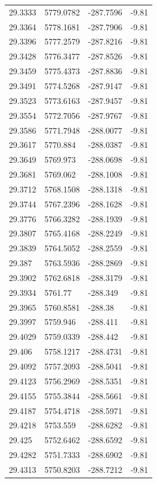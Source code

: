 \begin{table}[H]
\begin{tabular}{llll}
29.3333 & 5779.0782 & -287.7596 & -9.81 \\
29.3364 & 5778.1681 & -287.7906 & -9.81 \\
29.3396 & 5777.2579 & -287.8216 & -9.81 \\
29.3428 & 5776.3477 & -287.8526 & -9.81 \\
29.3459 & 5775.4373 & -287.8836 & -9.81 \\
29.3491 & 5774.5268 & -287.9147 & -9.81 \\
29.3523 & 5773.6163 & -287.9457 & -9.81 \\
29.3554 & 5772.7056 & -287.9767 & -9.81 \\
29.3586 & 5771.7948 & -288.0077 & -9.81 \\
29.3617 & 5770.884 & -288.0387 & -9.81 \\
29.3649 & 5769.973 & -288.0698 & -9.81 \\
29.3681 & 5769.062 & -288.1008 & -9.81 \\
29.3712 & 5768.1508 & -288.1318 & -9.81 \\
29.3744 & 5767.2396 & -288.1628 & -9.81 \\
29.3776 & 5766.3282 & -288.1939 & -9.81 \\
29.3807 & 5765.4168 & -288.2249 & -9.81 \\
29.3839 & 5764.5052 & -288.2559 & -9.81 \\
29.387 & 5763.5936 & -288.2869 & -9.81 \\
29.3902 & 5762.6818 & -288.3179 & -9.81 \\
29.3934 & 5761.77 & -288.349 & -9.81 \\
29.3965 & 5760.8581 & -288.38 & -9.81 \\
29.3997 & 5759.946 & -288.411 & -9.81 \\
29.4029 & 5759.0339 & -288.442 & -9.81 \\
29.406 & 5758.1217 & -288.4731 & -9.81 \\
29.4092 & 5757.2093 & -288.5041 & -9.81 \\
29.4123 & 5756.2969 & -288.5351 & -9.81 \\
29.4155 & 5755.3844 & -288.5661 & -9.81 \\
29.4187 & 5754.4718 & -288.5971 & -9.81 \\
29.4218 & 5753.559 & -288.6282 & -9.81 \\
29.425 & 5752.6462 & -288.6592 & -9.81 \\
29.4282 & 5751.7333 & -288.6902 & -9.81 \\
29.4313 & 5750.8203 & -288.7212 & -9.81 \\

\end{tabular}
\end{table}
